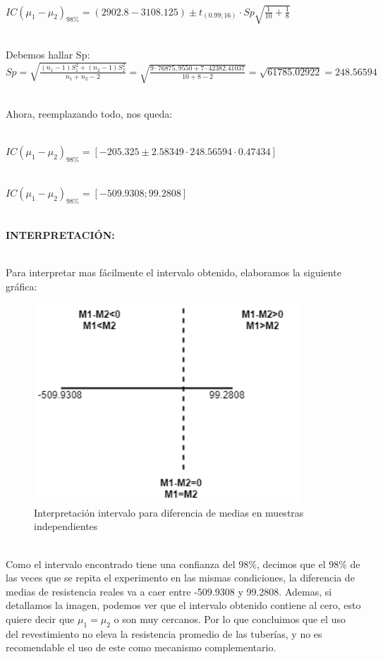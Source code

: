 \documentclass[letterpaper,12pt,onecolumn,titlepage]{article}
\begin{document}
~\\ $IC(\mu_1 - \mu_2)_{98\%}=(2902.8-3108.125)\pm t_{(0.99;16)}\cdot Sp\sqrt{\frac{1}{10}+\frac{1}{8}}$ 

~\\ Debemos hallar Sp:
~\\ $Sp=\sqrt{\frac{(n_{1}-1)S_{1}^2+(n_{2}-1)S_{2}^2}{n_{1}+n_{2}-2}}=\sqrt{\frac{9\cdot76875,9550+7\cdot42382.41037}{10+8-2}}=\sqrt{61785.02922}=248.56594$

~\\ Ahora, reemplazando todo, nos queda:

~\\ $IC(\mu_1 - \mu_2)_{98\%}=[-205.325 \pm 2.58349 \cdot 248.56594 \cdot 0.47434]$

~\\ $IC(\mu_1 - \mu_2)_{98\%}=[-509.9308 ; 99.2808]$

\pagebreak
~\\ \textbf{INTERPRETACI\'{O}N:}

~\\ Para interpretar mas f\'{a}cilmente el intervalo obtenido, elaboramos la siguiente gr\'{a}fica:
\begin{figure}[!h]
    \begin{center}
        \includegraphics[width=10cm]{Figuras/Grafico5.png}
        \caption{Interpretaci\'{o}n intervalo para diferencia de medias en muestras independientes}
        \label{fig:Densidad}
    \end{center}
\end{figure}
~\\ Como el intervalo encontrado tiene una confianza del $98\%$, decimos que el $98\%$ de las veces que se repita el experimento en las mismas condiciones, la diferencia de medias de resistencia reales va a caer entre -509.9308 y 99.2808. Ademas, si detallamos la imagen, podemos ver que el intervalo obtenido contiene al cero, esto quiere decir que $\mu_1=\mu_2$ o son muy cercanos. Por lo que concluimos que el uso del revestimiento no eleva la resistencia promedio de las tuber\'{i}as, y no es recomendable el uso de este como mecanismo complementario.
\end{document}
